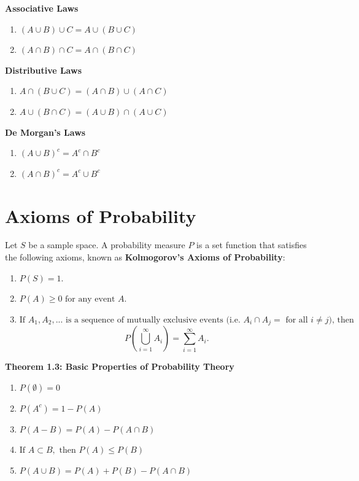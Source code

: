 \documentclass[
  12pt,
]{krantzNoCorner}
\providecommand{\tightlist}{%
  \setlength{\itemsep}{0pt}\setlength{\parskip}{0pt}}
\begin{document}
\textbf{Associative Laws}

\begin{enumerate}
\def\labelenumi{\arabic{enumi}.}
\tightlist
\item
  \((A \cup B) \cup C = A \cup (B \cup C)\)
\item
  \((A \cap B) \cap C = A \cap (B \cap C)\)
\end{enumerate}

\textbf{Distributive Laws}

\begin{enumerate}
\def\labelenumi{\arabic{enumi}.}
\tightlist
\item
  \(A \cap (B \cup C) = (A \cap B) \cup (A \cap C)\)
\item
  \(A \cup (B \cap C) = (A \cup B) \cap (A \cup C)\)
\end{enumerate}

\textbf{De Morgan's Laws}

\begin{enumerate}
\def\labelenumi{\arabic{enumi}.}
\tightlist
\item
  \((A\cup B)^c = A^c \cap B^c\)
\item
  \((A\cap B)^c = A^c \cup B^c\)
\end{enumerate}

\hypertarget{axioms-of-probability}{%
\section{Axioms of Probability}\label{axioms-of-probability}}

Let \(S\) be a sample space. A probability measure \(P\) is a set function
that satisfies the following axioms, known as \textbf{Kolmogorov's Axioms of Probability}:

\begin{enumerate}
\def\labelenumi{\arabic{enumi}.}
\tightlist
\item
  \(P(S)=1.\)
\item
  \(P(A)\geq 0 \mbox{ for any event } A\).
\item
  \(\mbox{If } A_1,A_2,... \mbox{ is a sequence of mutually exclusive events (i.e. } A_i\cap A_j = \mbox{ for all } i\neq j\mbox{), then }\)
  \[P\left(\bigcup_{i=1}^{\infty}A_i\right)=\sum_{i=1}^{\infty}A_i.\]
\end{enumerate}

\textbf{Theorem 1.3: Basic Properties of Probability Theory}

\begin{enumerate}
\def\labelenumi{\arabic{enumi}.}
\tightlist
\item
  \(P(\emptyset)=0\)
\item
  \(P(A^c)=1-P(A)\)
\item
  \(P(A-B) = P(A)-P(A\cap B)\)
\item
  \(\mbox{If }A\subset B, \mbox{ then } P(A)\leq P(B)\)
\item
  \(P(A\cup B)=P(A)+P(B)-P(A\cap B)\)
\end{enumerate}
\end{document}
